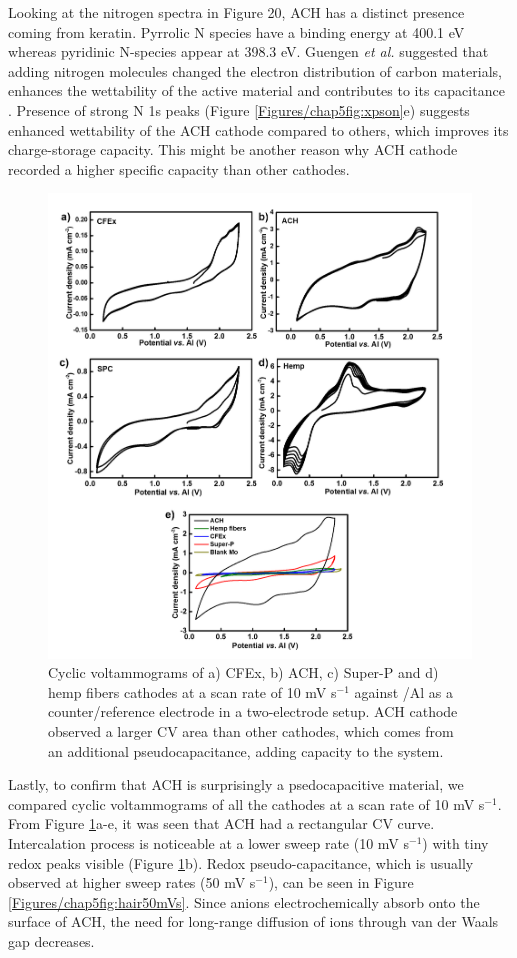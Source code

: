 Looking at the nitrogen spectra in Figure 20, ACH has a distinct presence coming from keratin. Pyrrolic N species have a binding energy at 400.1 eV whereas pyridinic N-species appear at 398.3 eV. Guengen \textit{et al.} suggested that adding nitrogen molecules changed the electron distribution of carbon materials, enhances the wettability of the active material and  contributes to its capacitance \cite{gueguen_xps_2016}. Presence of strong N 1s peaks (Figure \ref{Figures/chap5fig:xpson}e) suggests enhanced wettability of the ACH cathode compared to others, which improves its charge-storage capacity. This might be another reason why ACH cathode recorded a higher specific capacity than other cathodes. 
 \begin{figure}[tbh!]
  \centering
  \includegraphics[width=\textwidth]{Figures/chap5fig/CV}
    \caption{Cyclic voltammograms of a) CFEx, b) ACH, c) Super-P and d) hemp fibers cathodes at a scan rate of 10 mV s$^{-1}$ against /Al as a counter/reference electrode in a two-electrode setup. ACH cathode observed a larger CV area than other cathodes, which comes from an additional pseudocapacitance, adding capacity to the system.}
  \label{Figures/chap5fig:CV}
\end{figure}
Lastly, to confirm that ACH is surprisingly a psedocapacitive material, we compared cyclic voltammograms of all the cathodes at a scan rate of 10 mV s$^{-1}$. From Figure \ref{Figures/chap5fig:CV}a-e, it was seen that ACH had a rectangular CV curve. Intercalation process is noticeable at a lower sweep rate (10 mV s$^{-1}$) with tiny redox peaks visible (Figure \ref{Figures/chap5fig:CV}b). Redox pseudo-capacitance, which is usually observed at higher sweep rates (50 mV s$^{-1}$), can be seen in Figure \ref{Figures/chap5fig:hair50mVs}. Since  anions electrochemically absorb onto the surface of ACH, the  need for long-range diffusion of ions through van der Waals gap decreases. 

